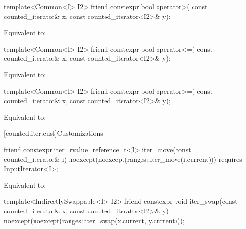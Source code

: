%
\begin{itemdecl}
template<Common<I> I2>
  friend constexpr bool operator>(
    const counted_iterator& x, const counted_iterator<I2>& y);
\end{itemdecl}

\begin{itemdescr}
\pnum
\effects Equivalent to: 
\end{itemdescr}

%
\begin{itemdecl}
template<Common<I> I2>
  friend constexpr bool operator<=(
    const counted_iterator& x, const counted_iterator<I2>& y);
\end{itemdecl}

\begin{itemdescr}
\pnum
\effects Equivalent to: 
\end{itemdescr}

%
\begin{itemdecl}
template<Common<I> I2>
  friend constexpr bool operator>=(
    const counted_iterator& x, const counted_iterator<I2>& y);
\end{itemdecl}

\begin{itemdescr}
\pnum
\effects Equivalent to: 
\end{itemdescr}

[counted.iter.cust]{Customizations}

%
\begin{itemdecl}
friend constexpr iter_rvalue_reference_t<I>
  iter_move(const counted_iterator& i)
    noexcept(noexcept(ranges::iter_move(i.current)))
    requires InputIterator<I>;
\end{itemdecl}

\begin{itemdescr}
\pnum
\effects Equivalent to: 
\end{itemdescr}

%
\begin{itemdecl}
template<IndirectlySwappable<I> I2>
  friend constexpr void
    iter_swap(const counted_iterator& x, const counted_iterator<I2>& y)
      noexcept(noexcept(ranges::iter_swap(x.current, y.current)));
\end{itemdecl}

